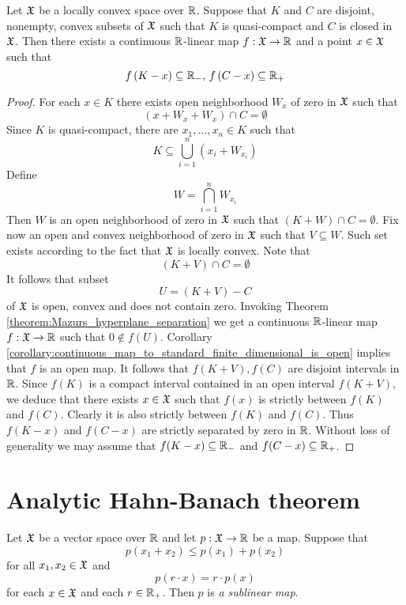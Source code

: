 \begin{theorem}\label{theorem:separation_in_locally_convex_spaces}
   Let ${\mathfrak X}$ be a locally convex space over ${\mathbb R}$. Suppose that $K$ and $C$ are disjoint, nonempty, convex subsets of ${\mathfrak X}$ such that $K$ is quasi-compact and $C$ is closed in ${\mathfrak X}$. Then there exists a continuous ${\mathbb R}$-linear map $f:{\mathfrak X}\rightarrow {\mathbb R}$ and a point $x \in {\mathfrak X}$ such that
   $$f\left(K - x\right) \subseteq {\mathbb R}_-,\,f\left(C - x\right)\subseteq {\mathbb R}_+$$
\end{theorem}
\begin{proof}
   For each $x \in K$ there exists open neighborhood $W_x$ of zero in ${\mathfrak X}$ such that
   $$\left(x + W_x + W_x\right)\cap C = \emptyset$$
   Since $K$ is quasi-compact, there are $x_1,...,x_n\in K$ such that
   $$K \subseteq \bigcup_{i=1}^n\left(x_i + W_{x_i}\right)$$
   Define
   $$W = \bigcap_{i=1}^nW_{x_i}$$
   Then $W$ is an open neighborhood of zero in ${\mathfrak X}$ such that $\left(K + W\right)\cap C = \emptyset$. Fix now an open and convex neighborhood of zero in ${\mathfrak X}$ such that $V \subseteq W$. Such set exists according to the fact that ${\mathfrak X}$ is locally convex. Note that
   $$\left(K + V\right)\cap C = \emptyset$$
   It follows that subset
   $$U = \left(K + V\right) - C$$
   of ${\mathfrak X}$ is open, convex and does not contain zero. Invoking Theorem \ref{theorem:Mazurs_hyperplane_separation} we get a continuous ${\mathbb R}$-linear map $f:{\mathfrak X} \rightarrow {\mathbb R}$ such that $0 \not \in f\left(U\right)$. Corollary \ref{corollary:continuous_map_to_standard_finite_dimensional_is_open} implies that $f$ is an open map. It follows that $f\left(K + V\right),f\left(C\right)$ are disjoint intervals in ${\mathbb R}$. Since $f(K)$ is a compact interval contained in an open interval $f(K + V)$, we deduce that there exists $x \in {\mathfrak X}$ such that $f(x)$ is strictly between $f\left(K\right)$ and $f\left(C\right)$. Clearly it is also strictly between $f(K)$ and $f(C)$. Thus $f(K - x)$ and $f(C - x)$ are strictly separated by zero in ${\mathbb R}$. Without loss of generality we may assume that $f(K - x) \subseteq {\mathbb R}_-$ and $f(C - x)\subseteq {\mathbb R}_+$.
\end{proof}

\section{Analytic Hahn-Banach theorem}

\begin{definition}
   Let ${\mathfrak X}$ be a vector space over ${\mathbb R}$ and let $p:{\mathfrak X}\rightarrow {\mathbb R}$ be a map. Suppose that
   $$p(x_1 + x_2)\leq p(x_1) + p(x_2)$$
   for all $x_1,x_2\in {\mathfrak X}$ and
   $$p(r\cdot x) = r\cdot p(x)$$
   for each $x\in {\mathfrak X}$ and each $r\in {\mathbb R}_+$. Then $p$ is \textit{a sublinear map}.
\end{definition}

